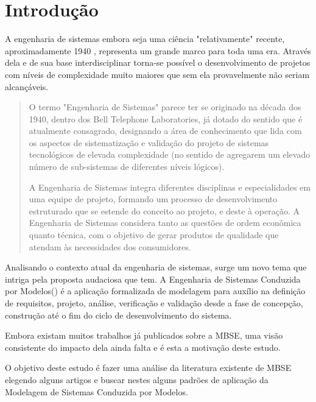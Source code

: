 \chapter[introducao]{Introdução}

A engenharia de sistemas embora seja uma ciência "relativamente" recente, aproximadamente 1940 \cite{EngSisUFMG}, representa um grande marco para toda uma era. Através dela e de sua base interdisciplinar torna-se possível o desenvolvimento de projetos com níveis de complexidade muito maiores que sem ela provavelmente não seriam alcançáveis.

\begin{quote}

O termo "Engenharia de Sistemas" parece ter se originado na década dos 1940, dentro dos Bell Telephone Laboratories, já dotado do sentido que é atualmente consagrado, designando a área de conhecimento que lida com os aspectos de sistematização e validação do projeto de sistemas tecnológicos de elevada complexidade (no sentido de agregarem um elevado número de sub-sistemas de diferentes níveis lógicos).

A Engenharia de Sistemas integra diferentes disciplinas e especialidades em uma equipe de projeto, formando um processo de desenvolvimento estruturado que se estende do conceito ao projeto, e deste à operação. A Engenharia de Sistemas considera tanto as questões de ordem econômica quanto técnica, com o objetivo de gerar produtos de qualidade que atendam às necessidades dos consumidores.

\cite{EngSisUFMG}

\end{quote}

Analisando o contexto atual da engenharia de sistemas, surge um novo tema que intriga pela proposta audaciosa que tem. A Engenharia de Sistemas Conduzida por Modelos() é a aplicação formalizada de modelagem para auxílio na definição de requisitos, projeto, análise, verificação e validação desde a fase de concepção, construção até o fim do ciclo de desenvolvimento do sistema.\cite{INCOSE200402}

Embora existam muitos trabalhos já publicados sobre a MBSE, uma visão consistente do impacto dela ainda falta e é esta a motivação deste estudo.

O objetivo deste estudo é fazer uma análise da literatura existente de MBSE elegendo alguns artigos e buscar nestes alguns padrões de aplicação da Modelagem de Sistemas Conduzida por Modelos.